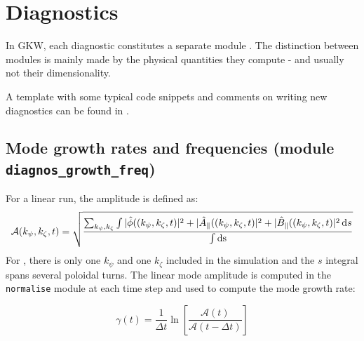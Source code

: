 \chapter{Diagnostics} 

In GKW, each diagnostic constitutes a separate module . The distinction
between modules is mainly made by the physical quantities they compute
- and usually not their dimensionality.

A template with some typical code snippets and comments on writing new
diagnostics can be found in .

\section{Mode growth rates and frequencies (module \texttt{diagnos\_growth\_freq})}
For a linear run, the amplitude is defined as:
\begin{equation}
\mathcal{A}(k_\psi,k_\zeta,t) = \sqrt{\frac{\sum_{k_\psi,k_\zeta} \int |\hat \phi((k_\psi,k_\zeta,t)|^2 + |\hat A_\parallel((k_\psi,k_\zeta,t)|^2 + |\hat B_\parallel((k_\psi,k_\zeta,t)|^2 \, {\rm d}s}{\int \textrm{ds}} }
\end{equation}
For , there is only one $k_\psi$ and one $k_\zeta$ included in the simulation and the $s$ integral spans several poloidal turns. The linear mode amplitude is computed in the \texttt{normalise} module at each time step and used to compute the mode growth rate:

\begin{equation}
\gamma(t)= \frac{1}{\Delta t}\ln \left[ \frac{\mathcal{A}(t)}{\mathcal{A}(t-\Delta t)} \right] 
\end{equation}

